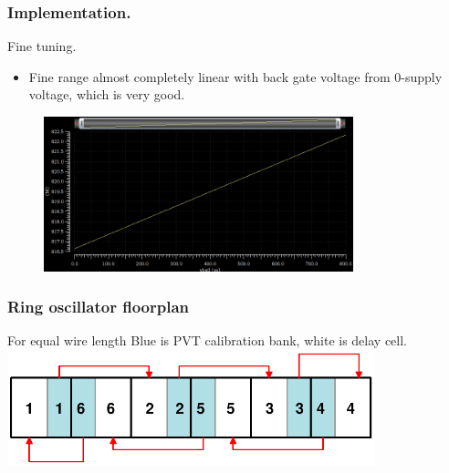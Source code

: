 \documentclass[t, screen, aspectratio=43]{beamer}
\begin{document}
\begin{frame}
	\frametitle{Implementation.}
	\begin{block}{Fine tuning.}
				\vspace{2em}
		\begin{minipage}{4cm}
			\tiny

			\begin{itemize}[itemsep=4pt,label=\protect---]
				\item Fine range almost completely linear with back gate voltage from 0-supply voltage, which is very good.
			\end{itemize}

		\end{minipage}%
		\begin{minipage}{8cm}
			\begin{figure}[htb!]
			        \centering
			        \includegraphics[width=0.8\textwidth, angle=0]{./fine_tuning}
			\end{figure}
		\end{minipage}%

	\end{block}	
\end{frame}

\begin{frame}
	\frametitle{Ring oscillator floorplan}
	\begin{block}{For equal wire length}
	Blue is PVT calibration bank, white is delay cell. 
	\center\includegraphics[width=0.8\textwidth, angle=0]{ro_floorplan}

  
	\end{block}

\end{frame}
\end{document}
